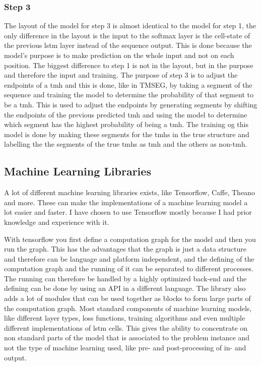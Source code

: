 \subsubsection{Step 3}
The layout of the model for step 3 is almost identical to the model for step 1, the only difference
in the layout is the input to the softmax layer is the cell-state of the previous \gls{lstm} layer
instead of the sequence output. This is done because the model's purpose is to make prediction on
the whole input and not on each position. The biggest difference to step 1 is not in the layout,
but in the purpose and therefore the input and training. The purpose of step 3 is to adjust the 
endpoints of a \gls{tmh} and this is done, like in TMSEG, by taking a segment of the sequence 
and training the model to determine the probability of that segment to be a \gls{tmh}. 
This is used to adjust the endpoints by generating segments by shifting the endpoints of the 
previous predicted \gls{tmh} and using the model to determine which segment has the highest
probability of being a \gls{tmh}. The training og this model is done by making these segments for
the \glspl{tmh} in the true structure and labelling the the segments of the true \glspl{tmh} as \gls{tmh}
and the others as non-\gls{tmh}. 

\subsection{Machine Learning Libraries}
A lot of different machine learning libraries exists, like Tensorflow\cite{tensorflow}, Caffe\cite{caffe}, 
Theano\cite{theano} and more. These can make the implementations of a machine learning model a lot easier 
and faster. I have chosen to use Tensorflow mostly because I had prior knowledge and experience with it.

With tensorflow you first define a computation graph for the model and then you run the graph.
This has the advantages that the graph is just a data structure and therefore can be language and platform 
independent, and the defining of the computation graph and the running of it can be separated to different 
processes. The running can therefore be handled by a highly optimized back-end and the defining can be done 
by using an API in a different language.
The library also adds a lot of modules that can be used together as blocks to form large parts of the 
computation graph. Most standard components of machine learning models, like different layer types, 
loss functions, training algorithms and even multiple different implementations of \gls{lstm} cells.
This gives the ability to concentrate on non standard parts of the model that is associated to the 
problem instance and not the type of machine learning used, like pre- and post-processing of in- and output.

